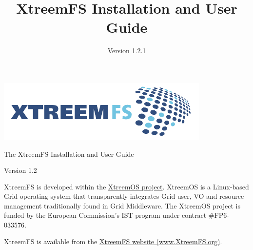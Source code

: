 \documentclass[a4paper,10pt]{book}
\title{XtreemFS Installation and User Guide}
\date{Version 1.2.1}
\begin{document}
\begin{titlepage}
\begin{flushright}
 \includegraphics{images/final_logo.pdf}
\end{flushright}

\vspace{3cm}

\begin{flushleft}
\sffamily \begin{LARGE}The XtreemFS Installation and User Guide\end{LARGE}

Version 1.2
\end{flushleft}


\end{titlepage}
\garamond
{}

XtreemFS is developed within the \href{http://www.xtreemos.eu}{XtreemOS project}. XtreemOS is a Linux-based Grid operating system that transparently integrates Grid user, VO and resource management traditionally found in Grid Middleware. The XtreemOS project is funded by the European Commission's IST program under contract \#FP6-033576.

XtreemFS is available from the \href{http://www.XtreemFS.org}{XtreemFS website (www.XtreemFS.org)}.
\end{document}
